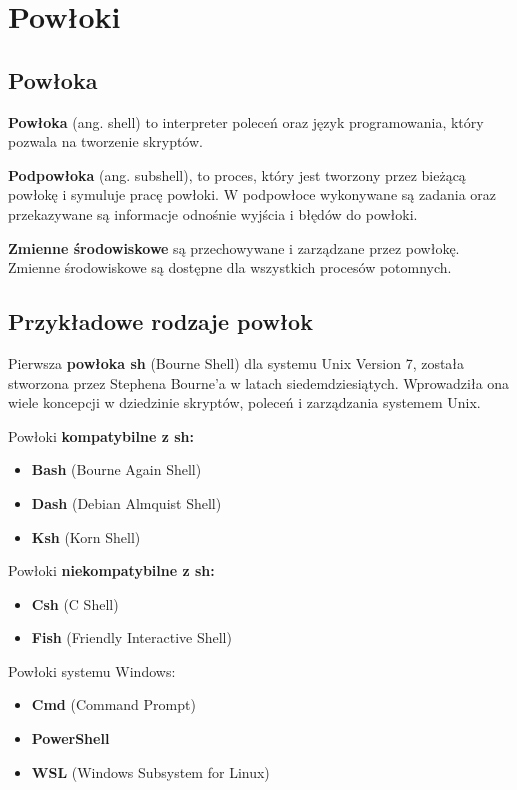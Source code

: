 \documentclass{article}
\begin{document}
\section{Powłoki}
\subsection{Powłoka}
\textbf{Powłoka} (ang. shell) to interpreter poleceń oraz język programowania, który pozwala na tworzenie skryptów.

\textbf{Podpowłoka} (ang. subshell), to proces, który jest tworzony przez bieżącą powłokę i symuluje pracę powłoki. W podpowłoce wykonywane są zadania oraz przekazywane są informacje odnośnie wyjścia i błędów do powłoki.

\textbf{Zmienne środowiskowe} są przechowywane i zarządzane przez powłokę. Zmienne środowiskowe są dostępne dla wszystkich procesów potomnych.

\subsection{Przykładowe rodzaje powłok}
Pierwsza \textbf{powłoka sh} (Bourne Shell) dla systemu Unix Version 7, została stworzona przez Stephena Bourne’a w latach siedemdziesiątych. Wprowadziła ona wiele koncepcji w dziedzinie skryptów, poleceń i zarządzania systemem Unix.

Powłoki \textbf{kompatybilne z sh:}
\begin{itemize}
    \item \textbf{Bash} (Bourne Again Shell)
    \item \textbf{Dash} (Debian Almquist Shell)
    \item \textbf{Ksh} (Korn Shell)
\end{itemize}

\newpage Powłoki \textbf{niekompatybilne z sh:}
\begin{itemize}
    \item \textbf{Csh} (C Shell)
    \item \textbf{Fish} (Friendly Interactive Shell)
\end{itemize}

Powłoki systemu Windows:
\begin{itemize}
    \item \textbf{Cmd} (Command Prompt)
    \item \textbf{PowerShell}
    \item \textbf{WSL} (Windows Subsystem for Linux)
\end{itemize}
\end{document}
